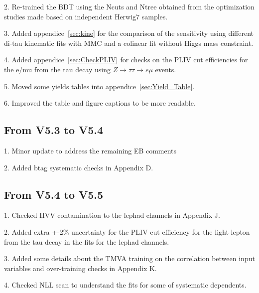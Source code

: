 2. Re-trained the BDT using the Ncuts and Ntree obtained from the optimization studies made based on independent Herwig7 samples.

3. Added appendice~\ref{sec:kine} for the comparison of the sensitivity using different di-tau kinematic fits with MMC and a colinear fit without Higgs mass constraint.

4. Added appendice~\ref{sec:CheckPLIV} for checks on the PLIV cut efficiencies for the e/mu from the tau decay using $Z\rightarrow\tau\tau\rightarrow e\mu$ events.

5. Moved some yields tables into appendice~\ref{sec:Yield_Table}.

6. Improved the table and figure captions to be more readable. 


\subsection{From V5.3 to V5.4}

1. Minor update to address the remaining EB comments

2. Added btag systematic checks in Appendix D. 

\subsection{From V5.4 to V5.5}

1. Checked HVV contamination to the lephad channels in Appendix J.

2. Added extra +-2\% uncertainty for the PLIV cut efficiency for the light lepton from the tau decay in the fits for the lephad channels.

3. Added some details about the TMVA training on the correlation between input variables and over-training checks in Appendix K.

4. Checked NLL scan to understand the fits for some of systematic dependents.
